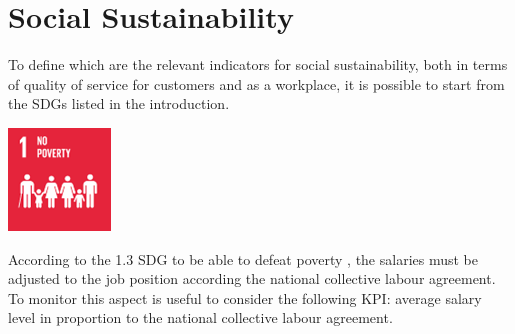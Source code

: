 \section{Social Sustainability}
To define which are the relevant indicators for social sustainability, both in terms of quality of service for customers and as a workplace, it is possible to start from the SDGs listed in the introduction.

\begin{minipage}[c]{0.2\textwidth}
    \includegraphics[width=\textwidth]{Images/Social_sustainability/1_no_poverty.png}
\end{minipage}
\begin{minipage}[c]{0.8\textwidth}
    According to the 1.3 SDG to be able to defeat poverty , the salaries must be adjusted to the job position according the national collective labour agreement. To monitor this aspect is useful to consider the following KPI: average salary level in proportion to the national collective labour agreement.
\end{minipage}
\hfill



